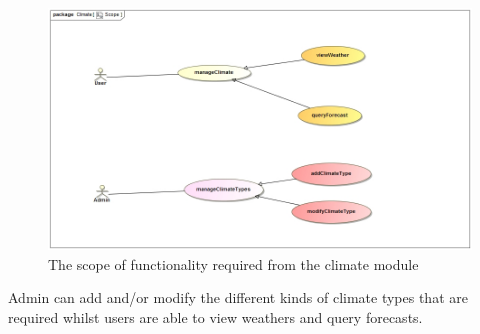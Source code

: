 
\begin{figure}[H]
	\centering
	\includegraphics[width=1.0\textwidth]{../images/ClimateScope.jpg}
	\caption{The scope of functionality required from the climate module \label{overflow}}
\end{figure}

Admin can add and/or modify the different kinds of climate types that are required whilst users are able to view weathers and query forecasts.